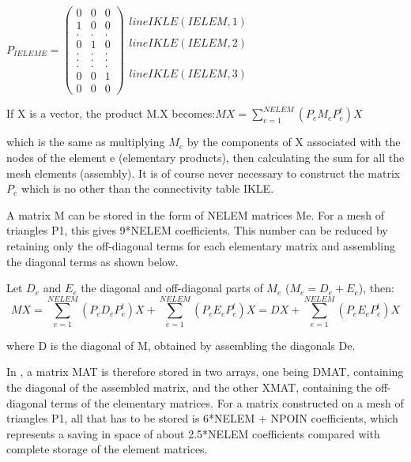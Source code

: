 $P_{IELEME}=\left(
  \begin{array}{ccc}
    0 & 0 & 0 \\
    1 & 0 & 0 \\
    . & . & . \\
    0 & 1 & 0 \\
    . & . & . \\
    . & . & . \\
    . & . & . \\
    0 & 0 & 1 \\
    0 & 0 & 0
  \end{array}
\right)
  \begin{array}{c}
    \\
    line IKLE(IELEM,1) \\
    \\
    line IKLE(IELEM,2) \\
    \\
    \\
    \\
    line IKLE(IELEM,3) \\
    \\
  \end{array}
$


If X is a vector, the product M.X becomes:$MX=\sum _{e=1}^{NELEM}(P_{e} M_{e}
P_{e}^{t} )X $

which is the same as multiplying $M_{e}$ by the components of X associated with the
nodes of the element e (elementary products), then calculating the sum for all
the mesh elements (assembly). It is of course never necessary to construct the
matrix $P_{e}$ which is no other than the connectivity table IKLE.

A matrix M can be stored in the form of NELEM matrices Me. For a mesh of
triangles P1, this gives 9*NELEM coefficients. This number can be reduced by
retaining only the off-diagonal terms for each elementary matrix and assembling
the diagonal terms as shown below.

Let $D_{e}$ and $E_{e}$ the diagonal and off-diagonal parts of $M_{e}$ ($M_{e}
= D_{e} + E_{e}$), then:
\[MX=\sum _{e=1}^{NELEM}(P_{e} D_{e} P_{e}^{t} )X+\sum _{e=1}^{NELEM}(P_{e}
E_{e} P_{e}^{t} )X  =DX+\sum _{e=1}^{NELEM}(P_{e} E_{e} P_{e}^{t} )X \]

where D is the diagonal of M, obtained by assembling the diagonals De.

In \bief, a matrix MAT is therefore stored in two arrays, one being DMAT,
containing the diagonal of the assembled matrix, and the other XMAT, containing
the off-diagonal terms of the elementary matrices. For a matrix constructed on
a mesh of triangles P1, all that has to be stored is 6*NELEM + NPOIN
coefficients, which represents a saving in space of about 2.5*NELEM
coefficients compared with complete storage of the element matrices.

